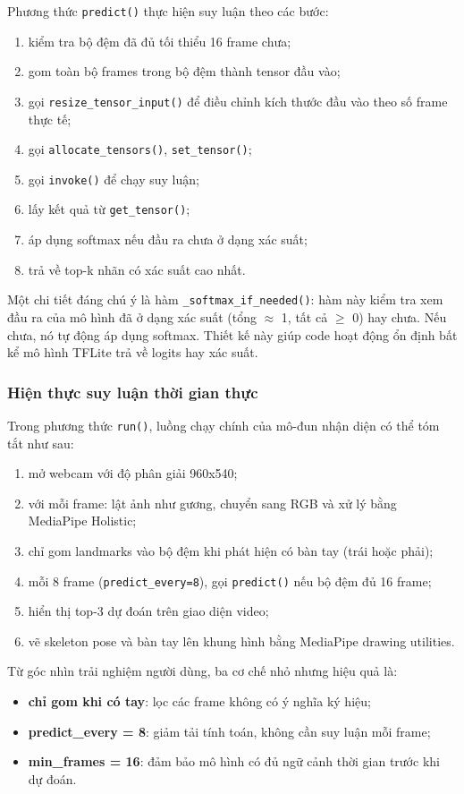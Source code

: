 Phương thức \texttt{predict()} thực hiện suy luận theo các bước:
\begin{enumerate}
    \item kiểm tra bộ đệm đã đủ tối thiểu 16 frame chưa;
    \item gom toàn bộ frames trong bộ đệm thành tensor đầu vào;
    \item gọi \texttt{resize\_tensor\_input()} để điều chỉnh kích thước đầu vào theo số frame
    thực tế;
    \item gọi \texttt{allocate\_tensors()}, \texttt{set\_tensor()};
    \item gọi \texttt{invoke()} để chạy suy luận;
    \item lấy kết quả từ \texttt{get\_tensor()};
    \item áp dụng softmax nếu đầu ra chưa ở dạng xác suất;
    \item trả về top-k nhãn có xác suất cao nhất.
\end{enumerate}

Một chi tiết đáng chú ý là hàm \texttt{\_softmax\_if\_needed()}: hàm này kiểm tra xem đầu ra
của mô hình đã ở dạng xác suất (tổng $\approx$ 1, tất cả $\geq$ 0) hay chưa. Nếu chưa, nó tự
động áp dụng softmax. Thiết kế này giúp code hoạt động ổn định bất kể mô hình TFLite trả về
logits hay xác suất.

\subsubsection{Hiện thực suy luận thời gian thực}

Trong phương thức \texttt{run()}, luồng chạy chính của mô-đun nhận diện có thể tóm tắt như sau:
\begin{enumerate}
    \item mở webcam với độ phân giải 960x540;
    \item với mỗi frame: lật ảnh như gương, chuyển sang RGB và xử lý bằng MediaPipe Holistic;
    \item chỉ gom landmarks vào bộ đệm khi phát hiện có bàn tay (trái hoặc phải);
    \item mỗi 8 frame (\texttt{predict\_every=8}), gọi \texttt{predict()} nếu bộ đệm đủ
    16 frame;
    \item hiển thị top-3 dự đoán trên giao diện video;
    \item vẽ skeleton pose và bàn tay lên khung hình bằng MediaPipe drawing utilities.
\end{enumerate}

Từ góc nhìn trải nghiệm người dùng, ba cơ chế nhỏ nhưng hiệu quả là:
\begin{itemize}
    \item \textbf{chỉ gom khi có tay}: lọc các frame không có ý nghĩa ký hiệu;
    \item \textbf{predict\_every = 8}: giảm tải tính toán, không cần suy luận mỗi frame;
    \item \textbf{min\_frames = 16}: đảm bảo mô hình có đủ ngữ cảnh thời gian trước khi
    dự đoán.
\end{itemize}

